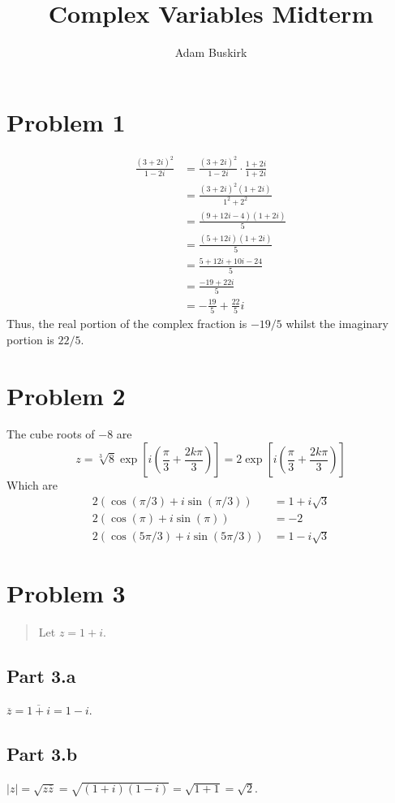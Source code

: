 \documentclass{article}
\title{Complex Variables Midterm}
\author{Adam Buskirk}
\theoremstyle{definition}
\newcommand{\p}[1]{\left(#1\right)}
\newcommand{\sq}[1]{\left[#1\right]}
\newcommand{\abs}[1]{\left|#1\right|}
\begin{document}
\maketitle

\section{Problem 1}
\begin{align*}
\frac{(3+2i)^2}{1-2i}
&= \frac{(3+2i)^2}{1-2i} \cdot \frac{1+2i}{1+2i} \\
&= \frac{(3+2i)^2 (1+2i)}{1^2+2^2} \\
&= \frac{(9+12i-4) (1+2i)}{5} \\
&= \frac{(5+12i) (1+2i)}{5} \\
&= \frac{5+12i+10i-24}{5} \\
&= \frac{-19+22i}{5} \\
&= -\frac{19}{5} + \frac{22}{5} i
\end{align*}
Thus, the real portion of the complex fraction is $-19/5$ whilst
the imaginary portion is $22/5$.

\section{Problem 2}
The cube roots of $-8$ are
\[
z = \sqrt[3]{8} \exp\sq{i\p{\frac{\pi}{3} + \frac{2k\pi}{3}}} 
= 2 \exp\sq{i\p{\frac{\pi}{3} + \frac{2 k \pi}{3}}}\tag{$k=0,1,2$}
\]
Which are 
\begin{align*}
2 (\cos(\pi/3)+i\sin(\pi/3)) &= 1 + i \sqrt{3} \\
2 (\cos(\pi) + i \sin(\pi) ) &= -2 \\
2 (\cos(5\pi/3) + i \sin(5\pi/3)) &= 1 - i \sqrt{3}
\end{align*}

\section{Problem 3}
\begin{quote}
Let $z = 1+i$.
\end{quote}
\subsection{Part 3.a}
$\overline{z}=\overline{1+i}=1-i$.
\subsection{Part 3.b}
$\abs{z}=\sqrt{z\overline{z}}=\sqrt{(1+i)(1-i)}=\sqrt{1+1}=\sqrt{2}$.
\end{document}
